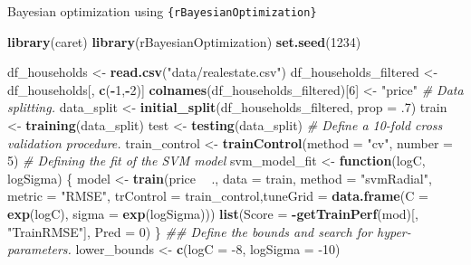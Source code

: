 \documentclass[12pt,ignorenonframetext,]{beamer}
\newenvironment{Shaded}{\begin{snugshade}}{\end{snugshade}}
\newcommand{\CommentTok}[1]{\textcolor[rgb]{0.56,0.35,0.01}{\textit{#1}}}
\newcommand{\ControlFlowTok}[1]{\textcolor[rgb]{0.13,0.29,0.53}{\textbf{#1}}}
\newcommand{\DataTypeTok}[1]{\textcolor[rgb]{0.13,0.29,0.53}{#1}}
\newcommand{\DecValTok}[1]{\textcolor[rgb]{0.00,0.00,0.81}{#1}}
\newcommand{\FloatTok}[1]{\textcolor[rgb]{0.00,0.00,0.81}{#1}}
\newcommand{\KeywordTok}[1]{\textcolor[rgb]{0.13,0.29,0.53}{\textbf{#1}}}
\newcommand{\NormalTok}[1]{#1}
\newcommand{\OperatorTok}[1]{\textcolor[rgb]{0.81,0.36,0.00}{\textbf{#1}}}
\newcommand{\StringTok}[1]{\textcolor[rgb]{0.31,0.60,0.02}{#1}}
\begin{document}
\begin{frame}[fragile]{Bayesian optimization using
\texttt{\{rBayesianOptimization\}}}
\protect\hypertarget{bayesian-optimization-using}{}

\tiny

\begin{Shaded}
\begin{Highlighting}[]
\KeywordTok{library}\NormalTok{(caret)}
\KeywordTok{library}\NormalTok{(rBayesianOptimization)}
\KeywordTok{set.seed}\NormalTok{(}\DecValTok{1234}\NormalTok{)}

\NormalTok{df_households <-}\StringTok{ }\KeywordTok{read.csv}\NormalTok{(}\StringTok{"data/realestate.csv"}\NormalTok{)}
\NormalTok{df_households_filtered <-}\StringTok{ }\NormalTok{df_households[, }\KeywordTok{c}\NormalTok{(}\OperatorTok{-}\DecValTok{1}\NormalTok{,}\OperatorTok{-}\DecValTok{2}\NormalTok{)]}
\KeywordTok{colnames}\NormalTok{(df_households_filtered)[}\DecValTok{6}\NormalTok{] <-}\StringTok{ "price"}
\CommentTok{# Data splitting.}
\NormalTok{data_split <-}\StringTok{ }\KeywordTok{initial_split}\NormalTok{(df_households_filtered, }\DataTypeTok{prop =} \FloatTok{.7}\NormalTok{)}
\NormalTok{train <-}\StringTok{ }\KeywordTok{training}\NormalTok{(data_split)}
\NormalTok{test  <-}\StringTok{ }\KeywordTok{testing}\NormalTok{(data_split)}
\CommentTok{# Define a 10-fold cross validation procedure.}
\NormalTok{train_control <-}\StringTok{ }\KeywordTok{trainControl}\NormalTok{(}\DataTypeTok{method =} \StringTok{"cv"}\NormalTok{, }\DataTypeTok{number =} \DecValTok{5}\NormalTok{)}
\CommentTok{# Defining the fit of the SVM model}
\NormalTok{svm_model_fit <-}\StringTok{ }\ControlFlowTok{function}\NormalTok{(logC, logSigma) \{}
\NormalTok{  model <-}\StringTok{ }\KeywordTok{train}\NormalTok{(price }\OperatorTok{~}\StringTok{ }\NormalTok{., }\DataTypeTok{data =}\NormalTok{ train, }\DataTypeTok{method =} \StringTok{"svmRadial"}\NormalTok{, }\DataTypeTok{metric =} \StringTok{"RMSE"}\NormalTok{,}
                  \DataTypeTok{trControl =}\NormalTok{ train_control,}\DataTypeTok{tuneGrid =} \KeywordTok{data.frame}\NormalTok{(}\DataTypeTok{C =} \KeywordTok{exp}\NormalTok{(logC), }\DataTypeTok{sigma =} \KeywordTok{exp}\NormalTok{(logSigma)))}
  \KeywordTok{list}\NormalTok{(}\DataTypeTok{Score =} \OperatorTok{-}\KeywordTok{getTrainPerf}\NormalTok{(mod)[, }\StringTok{"TrainRMSE"}\NormalTok{], }\DataTypeTok{Pred =} \DecValTok{0}\NormalTok{)}
\NormalTok{\}}
\CommentTok{## Define the bounds and search for hyper-parameters.}
\NormalTok{lower_bounds <-}\StringTok{ }\KeywordTok{c}\NormalTok{(}\DataTypeTok{logC =} \DecValTok{-8}\NormalTok{, }\DataTypeTok{logSigma =} \DecValTok{-10}\NormalTok{)}

\end{Highlighting}
\end{Shaded}
\end{frame}
\end{document}
